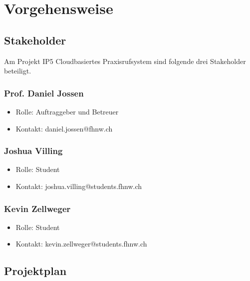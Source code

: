 \section{Vorgehensweise}\label{sec:vorgehensweise}

\subsection{Stakeholder}\label{subsec:stakeholder}

Am Projekt IP5 Cloudbasiertes Praxisrufsystem sind folgende drei Stakeholder beteiligt.

\subsubsection*{Prof. Daniel Jossen}

\begin{itemize}
    \item Rolle: Auftraggeber und Betreuer
    \item Kontakt: daniel.jossen@fhnw.ch
\end{itemize}

\subsubsection*{Joshua Villing}

\begin{itemize}
    \item Rolle: Student
    \item Kontakt: joshua.villing@students.fhnw.ch
\end{itemize}

\subsubsection*{Kevin Zellweger}

\begin{itemize}
    \item Rolle: Student
    \item Kontakt: kevin.zellweger@students.fhnw.ch
\end{itemize}

\clearpage

\subsection{Projektplan}\label{subsec:projektplan}

